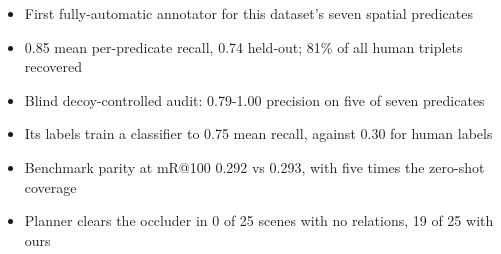 
\begin{itemize}
\item First fully-automatic annotator for this dataset's seven spatial predicates
\item 0.85 mean per-predicate recall, 0.74 held-out; 81\% of all human triplets recovered
\item Blind decoy-controlled audit: 0.79-1.00 precision on five of seven predicates
\item Its labels train a classifier to 0.75 mean recall, against 0.30 for human labels
\item Benchmark parity at mR@100 0.292 vs 0.293, with five times the zero-shot coverage
\item Planner clears the occluder in 0 of 25 scenes with no relations, 19 of 25 with ours
\end{itemize}
